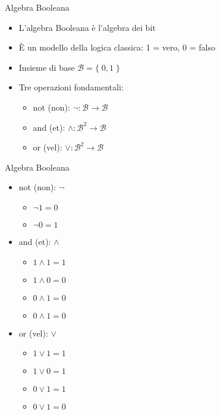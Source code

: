 \documentclass[xcolor=dvipsnames,handout]{beamer}
\begin{document}
\begin{frame}{Algebra Booleana}
  \vfill
  \begin{itemize}
    \item L'algebra Booleana è l'algebra dei bit
    \vfill
    \item È un \alert{modello} della logica classica: 1 = vero, 0 = falso
    \vfill
    \item Insieme di base \(\mathcal{B} = \{ \; 0, 1 \; \}\)
    \vfill
    \item Tre operazioni fondamentali:
    \begin{itemize}
      \item \alert{not} (non): \(\lnot : \mathcal{B} \to \mathcal{B}\)
      \item \alert{and} (et): \(\land : \mathcal{B}^2 \to \mathcal{B}\)
      \item \alert{or} (vel): \(\lor : \mathcal{B}^2 \to \mathcal{B}\)
    \end{itemize}
  \end{itemize}
  \vfill
\end{frame}

\begin{frame}{Algebra Booleana}
  \begin{itemize}
      \item \alert{not} (non): \(\lnot\)
      \begin{itemize}
        \item \(\lnot 1 = 0\)
        \item \(\lnot 0 = 1\)
      \end{itemize}
      \vfill
      \item \alert{and} (et): \(\land\)
      \begin{itemize}
        \item \(1 \land 1 = 1\)
        \item \(1 \land 0 = 0\)
        \item \(0 \land 1 = 0\)
        \item \(0 \land 1 = 0\)
      \end{itemize}
      \vfill
      \item \alert{or} (vel): \(\lor\)
      \begin{itemize}
        \item \(1 \lor 1 = 1\)
        \item \(1 \lor 0 = 1\)
        \item \(0 \lor 1 = 1\)
        \item \(0 \lor 1 = 0\)
      \end{itemize}
  \end{itemize}
\end{frame}
\end{document}
